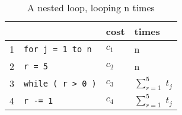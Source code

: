 \begin{center}
	\begin{table}[H]
		\centering
		\begin{tabular}{|l|l|l|l|}
			 \hline
			  &  										& \textbf{cost}  & \textbf{times}		\\ \hline
			1 & \lstinline|for j = 1 to n| 				& $c_1$ 		& n 					\\ 
			2 & \quad\quad \lstinline|r = 5|			& $c_2$ 		& n 					\\ 
			3 & \quad\quad \lstinline|while ( r > 0 )|	& $c_3$ 		& $\sum_{r=1}^{5}\;t_j$	\\ 
			4 & \quad\quad\quad\quad \lstinline|r -= 1| & $c_4$ 		& $\sum_{r=1}^{5}\;t_j$	\\ \hline
		\end{tabular}
		\caption{A nested loop, looping n times}
		\label{tab:simpleCode}
	\end{table}
\end{center}